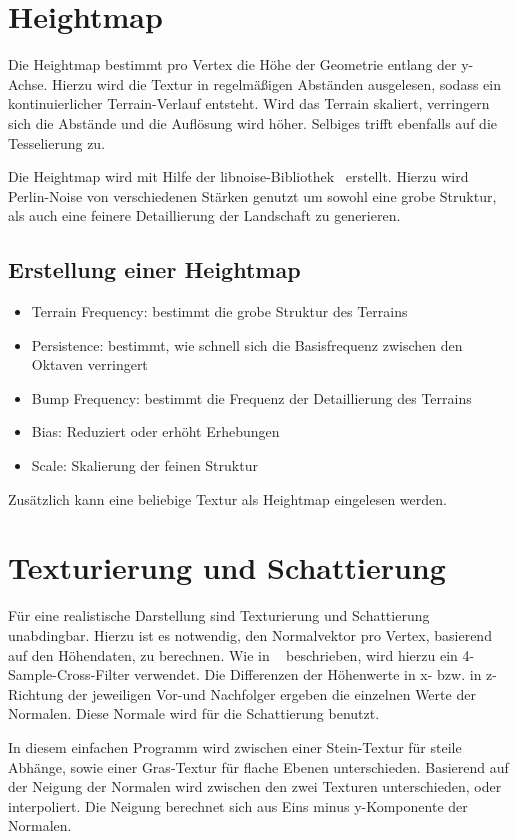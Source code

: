 \documentclass[a4paper,10pt]{article}
\begin{document}
\section*{Heightmap}
Die Heightmap bestimmt pro Vertex die Höhe der Geometrie entlang der y-Achse. Hierzu wird die Textur in regelmäßigen Abständen ausgelesen, sodass ein kontinuierlicher Terrain-Verlauf entsteht. Wird das Terrain skaliert, verringern sich die Abstände und die Auflösung wird höher. Selbiges trifft ebenfalls auf die Tesselierung zu.

Die Heightmap wird mit Hilfe der libnoise-Bibliothek~\cite{libnoise} erstellt. Hierzu wird Perlin-Noise von verschiedenen Stärken genutzt um sowohl eine grobe Struktur, als auch eine feinere Detaillierung der Landschaft zu generieren. 

\subsection*{Erstellung einer Heightmap}
\begin{itemize}
\item Terrain Frequency: bestimmt die grobe Struktur des Terrains
\item Persistence: bestimmt, wie schnell sich die Basisfrequenz zwischen den Oktaven verringert
\item Bump Frequency: bestimmt die Frequenz der Detaillierung des Terrains
\item Bias: Reduziert oder erhöht Erhebungen
\item Scale: Skalierung der feinen Struktur
\end{itemize}

Zusätzlich kann eine beliebige Textur als Heightmap eingelesen werden.

\section*{Texturierung und Schattierung}

Für eine realistische Darstellung sind Texturierung und Schattierung unabdingbar. Hierzu ist es notwendig, den Normalvektor pro Vertex, basierend auf den Höhendaten, zu berechnen. Wie in ~\cite{frostbite} beschrieben, wird hierzu ein 4-Sample-Cross-Filter verwendet. Die Differenzen der Höhenwerte in x- bzw. in z-Richtung der jeweiligen Vor-und Nachfolger ergeben die einzelnen Werte der Normalen. 
Diese Normale wird für die Schattierung benutzt. 

In diesem einfachen Programm wird zwischen einer Stein-Textur für steile Abhänge, sowie einer Gras-Textur für flache Ebenen unterschieden. Basierend auf der Neigung der Normalen wird zwischen den zwei Texturen unterschieden, oder interpoliert. Die Neigung berechnet sich aus Eins minus y-Komponente der Normalen. 
\end{document}
